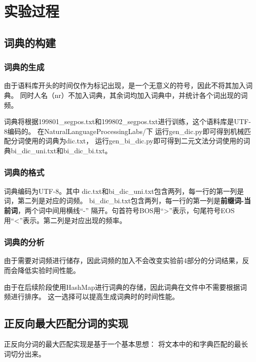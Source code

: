 \section{实验过程}

\subsection{词典的构建}

\subsubsection{词典的生成}

由于语料库开头的时间仅作为标记出现，是一个无意义的符号，因此不将其加入词典。
同时人名（nr）不加入词典，其余词均加入词典中，并统计各个词出现的词频。

词典将根据199801\_segpos.txt和199802\_segpos.txt进行训练，这个语料库是UTF-8编码的。
在NaturalLanguageProcessingLabs/下
运行gen\_dic.py即可得到机械匹配分词使用的词典为dic.txt，
运行gen\_bi\_dic.py即可得到二元文法分词使用的词典bi\_dic\_uni.txt和bi\_dic\_bi.txt。

\subsubsection{词典的格式}

词典编码为UTF-8。其中
dic.txt和bi\_dic\_uni.txt包含两列，每一行的第一列是词，第二列是对应的词频。
bi\_dic\_bi.txt包含两列，每一行的第一列是\textbf{前缀词-当前词}，两个词中间用横线“-”
隔开。句首符号BOS用“>”表示，句尾符号EOS用“<”表示。第二列是对应出现的频率。

\subsubsection{词典的分析}

由于需要对词频进行储存，因此词频的加入不会改变实验前4部分的分词结果，反而会降低实验时间性能。

由于在后续阶段使用HashMap进行词典的存储，因此词典在文件中不需要根据词频进行排序。
这一选择可以提高生成词典时的时间性能。

\subsection{正反向最大匹配分词的实现}

正反向分词的最大匹配实现是基于一个基本思想：
将文本中的和字典匹配的最长词切分出来\citep{张磊2009中文分词算法解析}。

